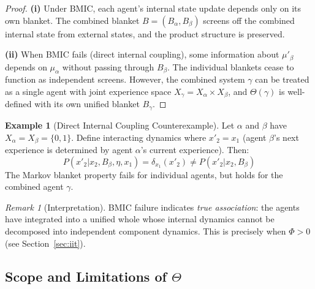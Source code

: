 \documentclass[11pt,a4paper]{article}
\theoremstyle{definition}
\newtheorem{example}[definition]{Example}
\theoremstyle{plain}
\theoremstyle{remark}
\newtheorem{remark}[definition]{Remark}
\begin{document}
\begin{proof}
\textbf{(i)} Under BMIC, each agent's internal state update depends only on its own blanket. The combined blanket $B = (B_\alpha, B_\beta)$ screens off the combined internal state from external states, and the product structure is preserved.

\textbf{(ii)} When BMIC fails (direct internal coupling), some information about $\mu'_\beta$ depends on $\mu_\alpha$ without passing through $B_\beta$. The individual blankets cease to function as independent screens. However, the combined system $\gamma$ can be treated as a single agent with joint experience space $X_\gamma = X_\alpha \times X_\beta$, and $\Theta(\gamma)$ is well-defined with its own unified blanket $B_\gamma$.
\end{proof}

\begin{example}[Direct Internal Coupling Counterexample]
Let $\alpha$ and $\beta$ have $X_\alpha = X_\beta = \{0, 1\}$. Define interacting dynamics where $x'_2 = x_1$ (agent $\beta$'s next experience is determined by agent $\alpha$'s current experience). Then:
\[
P(x'_2 | x_2, B_\beta, \eta, x_1) = \delta_{x_1}(x'_2) \neq P(x'_2 | x_2, B_\beta)
\]
The Markov blanket property fails for individual agents, but holds for the combined agent $\gamma$.
\end{example}

\begin{remark}[Interpretation]
BMIC failure indicates \emph{true association}: the agents have integrated into a unified whole whose internal dynamics cannot be decomposed into independent component dynamics. This is precisely when $\Phi > 0$ (see Section~\ref{sec:iit}).
\end{remark}

\subsection{Scope and Limitations of $\Theta$}
\end{document}
